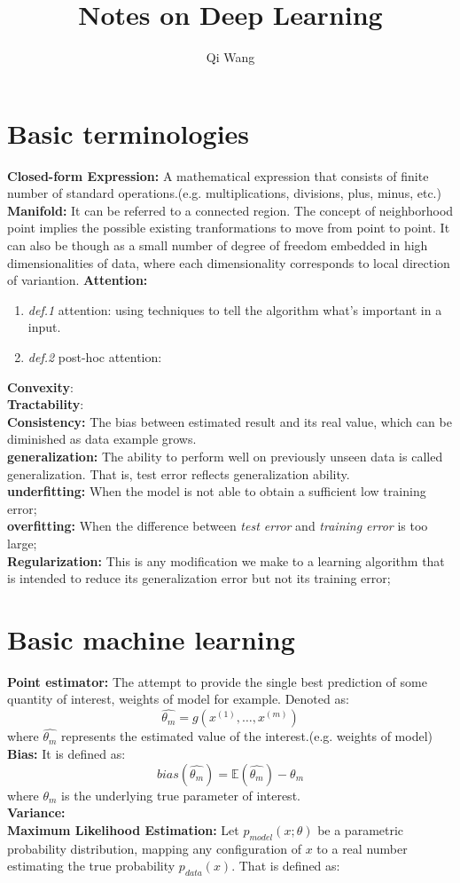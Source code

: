 \documentclass{article}
\author{Qi Wang}
\title{Notes on Deep Learning}
\begin{document}
\maketitle
\section{Basic terminologies}
\textbf{Closed-form Expression:} A mathematical expression that consists of finite number of standard operations.(e.g. multiplications, divisions, plus, minus, etc.)
\textbf{Manifold:}
It can be referred to a connected region. The concept of neighborhood point implies the possible existing tranformations to move from point to point. It can also be though as a small number of degree of freedom embedded in high dimensionalities of data, where each dimensionality corresponds to local direction of variantion. 
\textbf{Attention:}
\begin{enumerate}
\item \textit{def.1} attention: using techniques to tell the algorithm what's important in a input.
\item \textit{def.2} post-hoc attention:
\end{enumerate}
\textbf{Convexity}:\\
\textbf{Tractability}:\\
\textbf{Consistency:} The bias between estimated result and its real value, which can be diminished as data example grows.\\
\textbf{generalization:} The ability to perform well on previously unseen data is called generalization. That is, test error reflects generalization ability.\\
\textbf{underfitting:} When the model is not able to obtain a sufficient low training error;\\
\textbf{overfitting:} When the difference between \textit{test error} and \textit{training error} is too large;\\
\textbf{Regularization:} This is any modification we make to a learning algorithm that is intended to reduce its generalization error but not its training error;\\
\section{Basic machine learning}
\textbf{Point estimator: } The attempt to provide the single best prediction of some quantity of interest, weights of model for example. Denoted as:
$$\hat{\theta_{m}} = g(x^{(1)},\dots,x^{(m)})$$
where $\hat{\theta_{m}}$ represents the estimated value of the interest.(e.g. weights of model)\\
\textbf{Bias: } It is defined as:\\
$$bias(\hat{\theta_{m}}) = \mathbb{E}(\hat{\theta_{m}}) - \theta_{m}$$   
where $\theta_{m}$ is the underlying true parameter of interest. \\
\textbf{Variance:}\\
\textbf{Maximum Likelihood Estimation: }
Let $p_{model}(x;\theta)$ be a parametric probability distribution, mapping any configuration of $x$ to a real number estimating the true probability $p_{data}(x)$. That is defined as:
\end{document}
